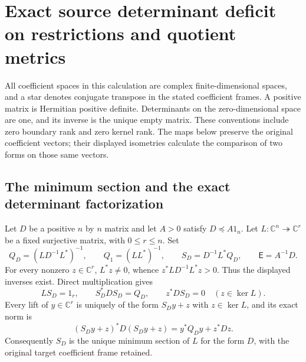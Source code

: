 \section{Exact source determinant deficit on restrictions and quotient metrics}

All coefficient spaces in this calculation are complex finite-dimensional
spaces, and a star denotes conjugate transpose in the stated coefficient
frames. A positive matrix is Hermitian positive definite. Determinants on
the zero-dimensional space are one, and its inverse is the unique empty
matrix. These conventions include zero boundary rank and zero kernel rank.
The maps below preserve the original coefficient vectors; their displayed
isometries calculate the comparison of two forms on those same vectors.

\subsection{The minimum section and the exact determinant factorization}

Let $D$ be a positive $n$ by $n$ matrix and let $A>0$ satisfy
$D\preceq A1_n$. Let
$L:\mathbb C^n\twoheadrightarrow\mathbb C^r$ be a fixed surjective
matrix, with $0\le r\le n$. Set
\[
 Q_D=(LD^{-1}L^*)^{-1},\qquad Q_1=(LL^*)^{-1},\qquad
 S_D=D^{-1}L^*Q_D,\qquad \mathsf E=A^{-1}D .
 \tag{QDC1}
\]
For every nonzero $z\in\mathbb C^r$, $L^*z\ne0$, whence
$z^*LD^{-1}L^*z>0$. Thus the displayed inverses exist.
Direct multiplication gives
\[
 LS_D=1_r,\qquad S_D^*DS_D=Q_D,\qquad
 z^*DS_D=0\quad(z\in\ker L).
 \tag{QDC2}
\]
Every lift of $y\in\mathbb C^r$ is uniquely of the form $S_Dy+z$
with $z\in\ker L$, and its exact norm is
\[
 (S_Dy+z)^*D(S_Dy+z)=y^*Q_Dy+z^*Dz.
 \tag{QDC3}
\]
Consequently $S_D$ is the unique minimum section of $L$ for the
form $D$, with the original target coefficient frame retained.

